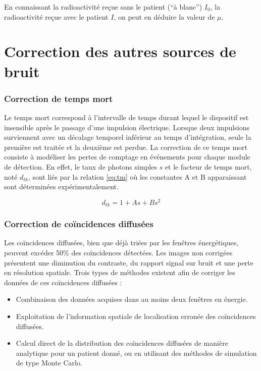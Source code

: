 En connaissant la radioactivité reçue sans le patient (``à blanc'') $I_0$, la radioactivité reçue avec le patient $I$, on peut en déduire la valeur de $\mu$.



	\section{Correction des autres sources de bruit}

\subsubsection{Correction de temps mort}


Le temps mort correspond à l’intervalle de temps durant lequel le dispositif est insensible après le passage d’une impulsion électrique. Lorsque deux impulsions surviennent avec un décalage temporel inférieur au temps d’intégration, seule la première est traitée et la deuxième est perdue. La correction de ce temps mort consiste à modéliser les pertes de comptage en événements pour chaque module de détection. En effet, le taux de photons simples $s$ et le facteur de temps mort, noté $d_{tk}$, sont liés par la relation \ref{eq:tm} où les constantes A et B apparaissant sont déterminées expérimentalement.

\begin{equation}
d_{tk} = 1 + As + Bs^2
\label{eq:tm}
\end{equation}



\subsubsection{Correction de coïncidences diffusées}

Les coïncidences diffusées, bien que déjà triées par les fenêtres énergétiques, peuvent excéder 50\% des coïncidences détectées. Les images non corrigées présentent une diminution du contraste, du rapport signal sur bruit et une perte en résolution spatiale. Trois types de méthodes existent afin de corriger les données de ces coïncidences diffusées : 
\begin{itemize}
\item Combinaison des données acquises dans au moins deux fenêtres en énergie.
\item Exploitation de l’information spatiale de localisation erronée des coïncidences diffusées.
\item Calcul direct de la distribution des coïncidences diffusées de manière analytique pour un patient donné, ou en utilisant des méthodes de simulation de type Monte Carlo.
\end{itemize}


